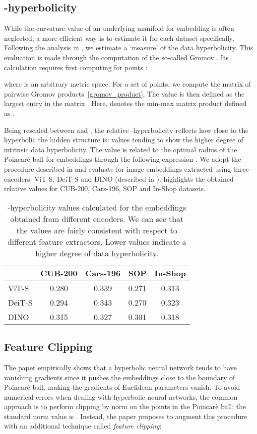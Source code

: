 \documentclass[10pt,twocolumn,letterpaper]{article}
\begin{document}
\subsection{-hyperbolicity}
\label{sec:delta}
While the curvature value of an underlying manifold for embedding is often neglected, a more efficient way is to estimate it for each dataset specifically. Following the analysis in \cite{khrulkov2020hyperbolic}, we estimate a `measure' of the data hyperbolicity. This evaluation is made through the computation of the so-called Gromov .
Its calculation requires first computing  for points :

where  is an arbitrary metric space. For a set of points, we compute the matrix  of pairwise Gromov products~\eqref{gromov_product}. The  value is then defined as the largest entry in the matrix . Here,  denotes the min-max matrix product defined as  \cite{fournier2015computing}.

Being rescaled between  and , the relative -hyperbolicity reflects how close to the hyperbolic the hidden structure is: values tending to  show the higher degree of intrinsic data hyperbolicity. The  value is related to the optimal radius of the Poincar\'e ball for embeddings through the following expression  .
We adopt the procedure described in \cite{khrulkov2020hyperbolic} and evaluate  for image embeddings extracted using three encoders: ViT-S, DeiT-S and DINO (described in ).  highlights the obtained relative  values for CUB-200, Cars-196, SOP and In-Shop datasets. \setlength{\tabcolsep}{0.6em}
\begin{table}
  \centering
  \begin{tabular}{lcccc}
    \toprule
    & CUB-200 & Cars-196 & SOP & In-Shop\\
    \midrule
ViT-S     & 0.280 & 0.339 & 0.271 & 0.313\\
    DeiT-S    & 0.294 & 0.343 & 0.270 & 0.323\\
    DINO      & 0.315 & 0.327 & 0.301 & 0.318\\
    \bottomrule
  \end{tabular}
  \caption{-hyperbolicity values calculated for the embeddings obtained from different encoders. We can see that the  values are fairly consistent with respect to different feature extractors. Lower  values indicate a higher degree of data hyperbolicity.}
  \label{tab:exp_c}
\end{table}

\subsection{Feature Clipping}
\label{sec:clip}
The paper \cite{guo2021free} empirically shows that a hyperbolic neural network tends to have vanishing gradients since it pushes the embeddings close to the boundary of Poincar\'e ball, making the gradients of Euclidean parameters vanish. To avoid numerical errors when dealing with hyperbolic neural networks, the common approach is to perform clipping by norm on the points in the Poincar\`e ball; the standard norm value is . Instead, the paper \cite{guo2021free} proposes to augment this procedure with an additional technique called \emph{feature clipping}: 
\end{document}

